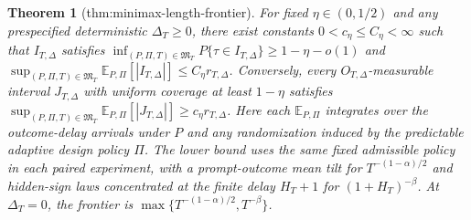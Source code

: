 \documentclass{article}
\newtheorem{theorem}{Theorem}
\begin{document}
\begin{theorem}[thm:minimax-length-frontier]\label{thm:minimax-length-frontier}
For fixed \(\eta\in(0,1/2)\) and any prespecified deterministic \(\Delta_T\geq0\), there exist constants \(0<c_\eta\leq C_\eta<\infty\) such that \(I_{T,\Delta}\) satisfies \(\inf_{(P,\Pi,T)\in\mathfrak M_T}P\{\tau\in I_{T,\Delta}\}\geq1-\eta-o(1)\) and \(\sup_{(P,\Pi,T)\in\mathfrak M_T}\mathbb E_{P,\Pi}[|I_{T,\Delta}|]\leq C_\eta r_{T,\Delta}\). Conversely, every \(O_{T,\Delta}\)-measurable interval \(J_{T,\Delta}\) with uniform coverage at least \(1-\eta\) satisfies \(\sup_{(P,\Pi,T)\in\mathfrak M_T}\mathbb E_{P,\Pi}[|J_{T,\Delta}|]\geq c_\eta r_{T,\Delta}\). Here each \(\mathbb E_{P,\Pi}\) integrates over the outcome-delay arrivals under \(P\) and any randomization induced by the predictable adaptive design policy \(\Pi\). The lower bound uses the same fixed admissible policy in each paired experiment, with a prompt-outcome mean tilt for \(T^{-(1-\alpha)/2}\) and hidden-sign laws concentrated at the finite delay \(H_T+1\) for \((1+H_T)^{-\beta}\). At \(\Delta_T=0\), the frontier is \(\max\{T^{-(1-\alpha)/2},T^{-\beta}\}\).
\end{theorem}
\end{document}
